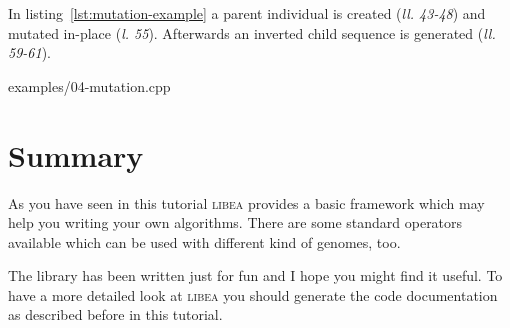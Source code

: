 \documentclass[a4paper]{article}
\begin{document}
In listing~\ref{lst:mutation-example} a parent individual is created (\textit{ll. 43-48}) and mutated in-place (\textit{l. 55}). Afterwards an inverted child sequence is generated (\textit{ll. 59-61}).

\begin{lstinputlisting}[caption=mutation operators,label=lst:mutation-example]{examples/04-mutation.cpp}
\end{lstinputlisting}

\section{Summary}

As you have seen in this tutorial \textsc{libea} provides a basic framework which may help you writing your own algorithms. There are some standard operators available which can be used with different kind of genomes, too.

The library has been written just for fun and I hope you might find it useful. To have a more detailed look at \textsc{libea} you should generate the code documentation as described before in this tutorial.
\end{document}
